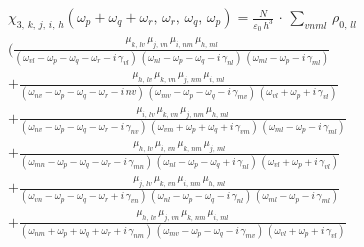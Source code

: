 \documentclass[12pt,twoside,a4paper]{article}
\numberwithin{equation}{subsection}
\numberwithin{figure}{subsection}
\begin{document}
\begin{equation} \label{eq:ssmods_cubic}
  \begin{split}
    & {\chi_{3, \,k, \,j, \,i, \,h}}({\omega_{p}} + {\omega_{q}} + {\omega_{r}}, \,{\omega_{r}}, \,{\omega_{q}}, \,{\omega_{p}})
       = \frac {N} {{\varepsilon_{0}}\,h^{3}} \, \cdot \, \sum_{vnml}\,{\rho_{0, \,ll}} \, 
 \\ & ( \frac {{\mu_{k,\,lv}}\,{\mu_{j,\,vn}}\,{\mu_{i,\,nm}}\,{\mu_{h,\,ml}}}
  	          {({\omega_{vl}} - {\omega_{p}} - {\omega_{q}} - {\omega_{r}} - i\,{\gamma_{vl}}) \,
  	           ({\omega_{nl}} - {\omega_{p}} - {\omega_{q}} - i\,{\gamma_{nl}}) \,
  	           ({\omega_{ml}} - {\omega_{p}} - i\,{\gamma_{ml}})} 
 \\ & + \frac {{\mu_{h,\,lv}}\,{\mu_{k,\,vn}}\,{\mu_{j,\,nm}}\,{\mu_{i,\,ml}}}
              {({\omega_{nv}} - {\omega_{p}} - {\omega_{q}} - {\omega_{r}} - i\,nv) \,
               ({\omega_{mv}} - {\omega_{p}} - {\omega_{q}} - i\,{\gamma_{mv}}) \,
               ({\omega_{vl}} + {\omega_{p}} + i\,{\gamma_{vl}})}
 \\ & + \frac {{\mu_{i,\,lv}}\,{\mu_{k,\,vn}}\,{\mu_{j,\,nm}}\,{\mu_{h,\,ml}}}
              {({\omega_{nv}} - {\omega_{p}} - {\omega_{q}} - {\omega_{r}} - i\,{\gamma_{nv}}) \,
               ({\omega_{vm}} + {\omega_{p}} + {\omega_{q}} + i\,{\gamma_{vm}}) \,
               ({\omega_{ml}} - {\omega_{p}} - i\,{\gamma_{ml}})}
 \\ & + \frac {{\mu_{h,\,lv}}\,{\mu_{i,\,vn}}\,{\mu_{k,\,nm}}\,{\mu_{j,\,ml}}}
              {({\omega_{mn}} - {\omega_{p}} - {\omega_{q}} - {\omega_{r}} - i\,{\gamma_{mn}}) \,
               ({\omega_{nl}} - {\omega_{p}} - {\omega_{q}} + i\,{\gamma_{nl}}) \,
               ({\omega_{vl}} + {\omega_{p}} + i\,{\gamma_{vl}})} 
 \\ & + \frac {{\mu_{j,\,lv}}\,{\mu_{k,\,vn}}\,{\mu_{i,\,nm}}\,{\mu_{h,\,ml}}}
              {({\omega_{vn}} - {\omega_{p}} - {\omega_{q}} - {\omega_{r}} + i\,{\gamma_{vn}}) \,
               ({\omega_{nl}} - {\omega_{p}} - {\omega_{q}} - i\,{\gamma_{nl}}) \,
               ({\omega_{ml}} - {\omega_{p}} - i\,{\gamma_{ml}})}
 \\ & + \frac {{\mu_{h,\,lv}}\,{\mu_{j,\,vn}}\,{\mu_{k,\,nm}}\,{\mu_{i,\,ml}}}
              {({\omega_{nm}} + {\omega_{p}} + {\omega_{q}} + {\omega_{r}} + i\,{\gamma_{nm}}) \,
               ({\omega_{mv}} - {\omega_{p}} - {\omega_{q}} - i\,{\gamma_{mv}}) \,
               ({\omega_{vl}} + {\omega_{p}} + i\,{\gamma_{vl}})}

\end{split}
\end{equation}
\end{document}
